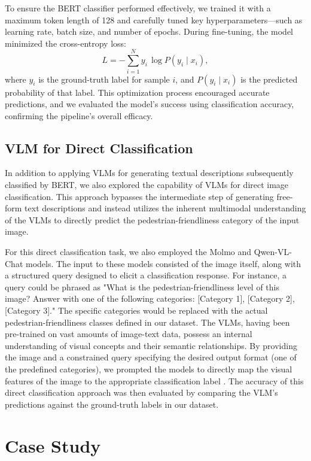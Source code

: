 \documentclass[11pt]{article}
\begin{document}
To ensure the BERT classifier performed effectively, we trained it with a maximum token length of 128 and carefully tuned key hyperparameters—such as learning rate, batch size, and number of epochs. During fine-tuning, the model minimized the cross-entropy loss:
\begin{equation}
L = - \sum_{i=1}^{N} y_i \,\log P(y_i \mid x_i),
\end{equation}
where \( y_i \) is the ground-truth label for sample \( i \), and \( P(y_i \mid x_i) \) is the predicted probability of that label. This optimization process encouraged accurate predictions, and we evaluated the model’s success using classification accuracy, confirming the pipeline’s overall efficacy.

\subsection{VLM for Direct Classification}
In addition to applying VLMs for generating textual descriptions subsequently classified by BERT, we also explored the capability of VLMs for direct image classification. This approach bypasses the intermediate step of generating free-form text descriptions and instead utilizes the inherent multimodal understanding of the VLMs to directly predict the pedestrian-friendliness category of the input image.

For this direct classification task, we also employed the Molmo and Qwen-VL-Chat models. The input to these models consisted of the image itself, along with a structured query designed to elicit a classification response. For instance, a query could be phrased as "What is the pedestrian-friendliness level of this image? Answer with one of the following categories: [Category 1], [Category 2], [Category 3]." The specific categories would be replaced with the actual pedestrian-friendliness classes defined in our dataset. The VLMs, having been pre-trained on vast amounts of image-text data, possess an internal understanding of visual concepts and their semantic relationships. By providing the image and a constrained query specifying the desired output format (one of the predefined categories), we prompted the models to directly map the visual features of the image to the appropriate classification label \citep{bordes2024introduction}. The accuracy of this direct classification approach was then evaluated by comparing the VLM's predictions against the ground-truth labels in our dataset.

\section{Case Study}
\end{document}
